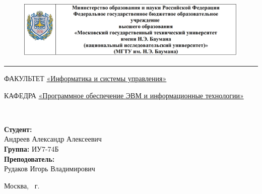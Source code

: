 \documentclass[a4paper, 12pt]{article}
\begin{document}
	
\begin{titlepage}
	\fontsize{12pt}{12pt}\selectfont
	\begin{figure}[t!]
		\centering
		\includegraphics[scale=0.8]{bmstu}
	\end{figure}
	
	\noindent\rule{15cm}{3pt}
	\newline\newline
	\noindent 
	ФАКУЛЬТЕТ 
	\underline{«Информатика и системы управления»} \newline
	
	\noindent КАФЕДРА \underline{«Программное обеспечение ЭВМ и информационные технологии»}\newline\newline\newline\newline\newline
	
	\vspace{4mm}
	
	\\ 
	\vspace{20mm}
	
	
	\begin{flushright}
		{\small	\textbf{Студент:}\\ Андреев Александр Алексеевич \\ \textbf{Группа:} ИУ7-74Б
			\vspace{3mm}
			\\\textbf{Преподователь:} \\ Рудаков Игорь Владимирович }
	\end{flushright}
	
	\begin{center}
		\vfill
		Москва, \the\year
		~г.
	\end{center}
\end{titlepage}

\tableofcontents
\clearpage
\newpage
\end{document}
